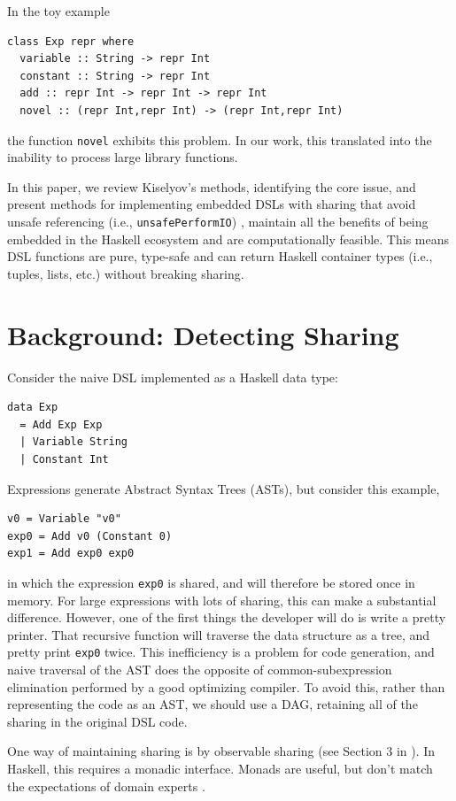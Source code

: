 \documentclass[runningheads]{llncs}
\begin{document}
In the toy example
\begin{verbatim}
class Exp repr where
  variable :: String -> repr Int
  constant :: String -> repr Int
  add :: repr Int -> repr Int -> repr Int
  novel :: (repr Int,repr Int) -> (repr Int,repr Int)
\end{verbatim}
the function \texttt{novel} exhibits this problem.
 In our work,
this translated into the inability to process large library functions.

\smallskip
In this paper, we review Kiselyov's methods, identifying the core issue, and
present methods for implementing embedded DSLs with sharing that avoid  unsafe referencing (i.e., \texttt{unsafePerformIO}) \cite{gill:observablesharing}, maintain all the benefits of being embedded in the Haskell ecosystem and are computationally feasible. This
means DSL functions are pure, type-safe and can return Haskell container types (i.e.,
tuples, lists, etc.) without breaking sharing.

\section{Background: Detecting Sharing}

Consider the naive DSL implemented as a Haskell data type:
\begin{verbatim}
data Exp
  = Add Exp Exp
  | Variable String
  | Constant Int
\end{verbatim}
Expressions generate Abstract Syntax Trees (ASTs),
but consider this example,
\begin{verbatim}
v0 = Variable "v0"
exp0 = Add v0 (Constant 0)
exp1 = Add exp0 exp0
\end{verbatim}
in which the expression  \texttt{exp0} is shared,
and will therefore be stored once in memory.
For large expressions with lots of sharing,
this can make a substantial difference.
However,
one of the first things the developer will do is write a pretty printer.
That recursive function will traverse the data structure as a tree,
and pretty print \texttt{exp0} twice.
This inefficiency is a problem for code generation,
and naive traversal of the AST does the opposite of common-subexpression elimination performed by a good optimizing compiler.
To avoid this,
rather than representing the code as an AST, 
we should use a DAG, retaining all of the sharing in the original DSL code. 

One way of maintaining sharing is by observable sharing (see Section 3 in \cite{kiselyov:sharing}).
In Haskell, this requires a monadic interface.
Monads are useful, but don't match the expectations of domain experts \cite{odonnell:embedding}.
\end{document}
